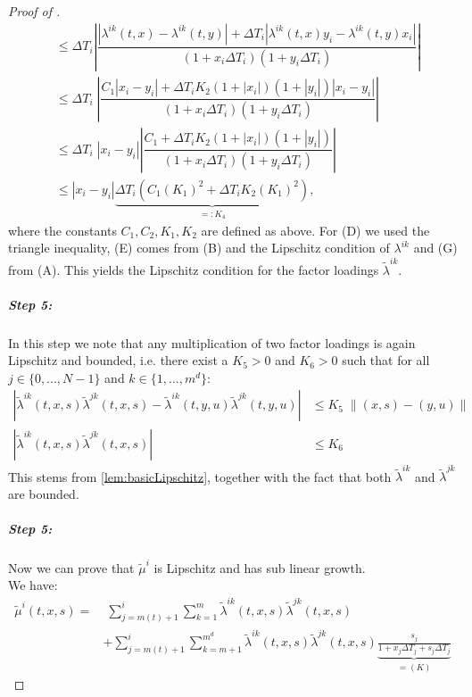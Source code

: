\documentclass[12pt]{article}
\begin{document}
\begin{proof}[Proof of ]
\begin{align*}
			&\le \Delta T_i \left|\dfrac{\left|\lambda^{i k}(t,x) - \lambda^{i k}(t,y)\right| + \Delta T_i \left|\lambda^{i k}(t,x) y_i - \lambda^{i k}(t,y)x_i\right|}{\left(1 + x_i\Delta T_i\right)\left(1 + y_i\Delta T_i\right)}\right|\tag{D}\\
			&\le \Delta T_i \;\left|\dfrac{C_1\left|x_i - y_i\right| + \Delta T_i K_2 \left(1 + \left|x_i\right|\right)\left( 1 +\left| y_i \right| \right) \left|x_i - y_i\right|}{\left(1 + x_i\Delta T_i\right)\left(1 + y_i\Delta T_i\right)}\right|\tag{E}\\
			&\le \Delta T_i \;\left|x_i - y_i\right|\left|\dfrac{C_1 + \Delta T_i K_2 \left(1 + \left|x_i\right|\right) \left( 1 +\left| y_i \right| \right)}{\left(1 + x_i\Delta T_i\right)\left(1 + y_i\Delta T_i\right)}\right|\tag{F}\\
			&\le \left|x_i - y_i\right| \underbrace{\Delta T_i \left(C_1 \left(K_1\right)^2 +\Delta T_i  K_2 \left(K_1\right)^2\right)}_{=:K_4},\tag{G}
		\end{align*}
		where the constants $C_1, C_2, K_1, K_2$ are defined as above. For (D) we used the triangle inequality, (E) comes from (B) and the Lipschitz condition of $\lambda^{i k}$ and (G) from (A). This yields the Lipschitz condition for the factor loadings $\tilde{\lambda}^{ik}$.
		\subparagraph{Step 5:}
		In this step we note that any multiplication of two factor loadings is again Lipschitz and bounded, i.e. there exist a $K_5 > 0$ and $K_6>0$ such that for all $j \in \{0,...,N-1\}$ and $k\in\{1,...,m^d\}$:
		\begin{align*}
			\left|\tilde{\lambda}^{i k}\left(t,x, s\right)\tilde{\lambda}^{j k}\left(t,x, s\right) - \tilde{\lambda}^{i k}\left(t,y, u\right)\tilde{\lambda}^{j k}\left(t,y, u\right)\right| &\le K_5\; \lVert(x,s) - (y,u)\rVert \\
			\left|\tilde{\lambda}^{i k}\left(t,x, s\right)\tilde{\lambda}^{j k}\left(t,x, s\right)\right| &\le K_6\tag{H}
		\end{align*}
		This stems from \cref{lem:basicLipschitz}, together with the fact that both $\tilde{\lambda}^{i k}$ and $\tilde{\lambda}^{j k}$ are bounded.
		\subparagraph{Step 5:}
		Now we can prove that $\tilde{\mu}^i$ is Lipschitz and has sub linear growth.\\
		We have:
		\begin{align*}
			\tilde{\mu}^i\left(t,x,s\right) = &\; \sum_{j=m(t)+1}^{i}\sum_{k=1}^{m}\tilde{\lambda}^{i k}\left(t, x, s\right)\tilde{\lambda}^{j k}\left(t, x, s\right)\tag{I}\\
			&+ \sum_{j=m(t)+1}^{i}  \sum_{k=m+1}^{m^d}  \tilde{\lambda}^{i k}\left(t, x, s\right)\tilde{\lambda}^{j k}\left(t, x, s\right)\underbrace{\frac{s_j}{1 + x_j\Delta T_j + s_j\Delta T_j}}_{=(K)}\tag{J}

\end{align*}
\end{proof}
\end{document}
